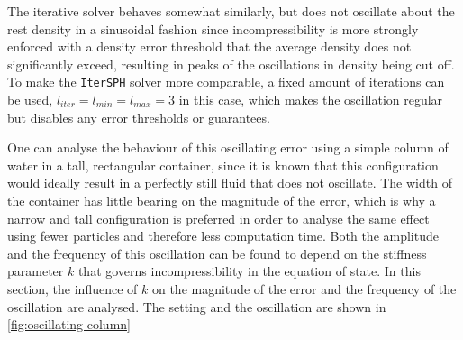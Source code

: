 The iterative solver behaves somewhat similarly, but does not oscillate about the rest density in a sinusoidal fashion since incompressibility is more strongly enforced with a density error threshold that the average density does not significantly exceed, resulting in peaks of the oscillations in density being cut off. To make the \texttt{IterSPH} solver more comparable, a fixed amount of iterations can be used, $l_{iter}=l_{min}=l_{max}=3$ in this case, which makes the oscillation regular but disables any error thresholds or guarantees.

One can analyse the behaviour of this oscillating error using a simple column of water in a tall, rectangular container, since it is known that this configuration would ideally result in a perfectly still fluid that does not oscillate. The width of the container has little bearing on the magnitude of the error, which is why a narrow and tall configuration is preferred in order to analyse the same effect using fewer particles and therefore less computation time. Both the amplitude and the frequency of this oscillation can be found to depend on the stiffness parameter $k$ that governs incompressibility in the equation of state. In this section, the influence of $k$ on the magnitude of the error and the frequency of the oscillation are analysed. The setting and the oscillation are shown in \autoref{fig:oscillating-column}

